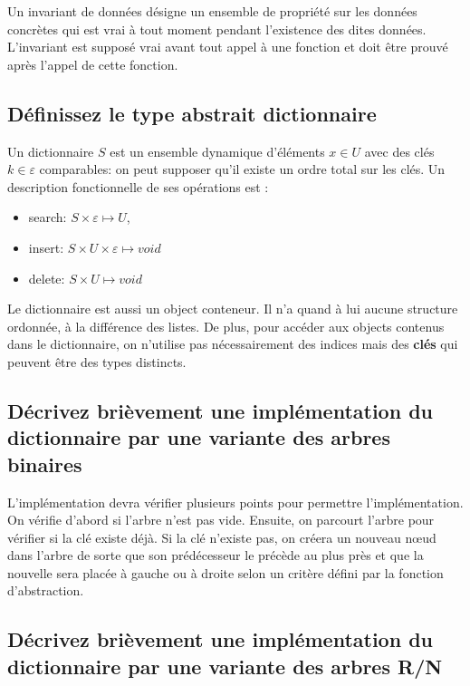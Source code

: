 \documentclass[11pt]{article}
\begin{document}
Un invariant de données désigne un ensemble de propriété sur les données concrètes qui est vrai à tout moment pendant l'existence des dites données. L'invariant est supposé vrai avant tout appel à une fonction et doit être prouvé après l'appel de cette fonction.

\subsection{Définissez le type abstrait dictionnaire}

Un dictionnaire $S$ est un ensemble dynamique d'éléments $x \in U$ avec des clés $k \in \varepsilon$ comparables: on peut supposer qu'il existe un ordre total sur les clés. Un description fonctionnelle de ses opérations est :

\begin{itemize}
	\item search: $S \times \varepsilon \mapsto U$,
	\item insert: $S \times U \times \varepsilon \mapsto void$
	\item delete: $S \times U \mapsto void$
\end{itemize} 

Le dictionnaire est aussi un object conteneur. Il n'a quand à lui aucune structure ordonnée, à la différence des listes. De plus, pour accéder aux objects contenus dans le dictionnaire, on n'utilise pas nécessairement des indices mais des \textbf{clés} qui peuvent être des types distincts. 

\subsection{Décrivez brièvement une implémentation du dictionnaire par une variante des arbres binaires}

L’implémentation devra vérifier plusieurs points pour permettre l’implémentation. On vérifie d’abord si l’arbre n’est pas vide. Ensuite, on parcourt l’arbre pour vérifier si la clé existe déjà. Si la clé n’existe pas, on créera un nouveau nœud dans l’arbre de sorte que son prédécesseur le précède au plus près et que la nouvelle sera placée à gauche ou à droite selon un critère défini par la fonction d’abstraction.

\subsection{Décrivez brièvement une implémentation du dictionnaire par une variante des arbres R/N}
\end{document}
